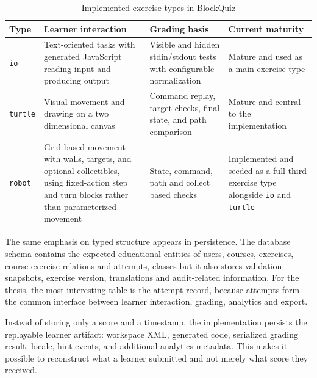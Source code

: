 \begin{table}[H]
  \footnotesize
  \caption{Implemented exercise types in BlockQuiz}
  \label{tab:impl-exercise-families}
  \begin{tabularx}{\textwidth}{|l|X|X|X|}
    \hline
    \textbf{Type}   & \textbf{Learner interaction}                                                                                                                   & \textbf{Grading basis}                                                & \textbf{Current maturity}                                                                        \\\hline
    \texttt{io}     & Text-oriented tasks with generated JavaScript reading input and producing output                                                               & Visible and hidden stdin/stdout tests with configurable normalization & Mature and used as a main exercise type                                                        \\\hline
    \texttt{turtle} & Visual movement and drawing on a two dimensional canvas                                                                                        & Command replay, target checks, final state, and path comparison       & Mature and central to the implementation                                                         \\\hline
    \texttt{robot}  & Grid based movement with walls, targets, and optional collectibles, using fixed-action step and turn blocks rather than parameterized movement & State, command, path and collect based checks                         & Implemented and seeded as a full third exercise type alongside \texttt{io} and \texttt{turtle} \\\hline
  \end{tabularx}
\end{table}

The same emphasis on typed structure appears in persistence. The database schema contains the
expected educational entities of users, courses, exercises, course-exercise relations and attempts,
classes but it also stores validation snapshots, exercise version,
translations and audit-related information.
For the thesis, the most interesting table is the attempt record, because attempts form the
common interface between learner interaction, grading, analytics and export.

Instead of storing only a score and a timestamp, the implementation persists the replayable
learner artifact: workspace XML, generated code, serialized grading result, locale, hint events,
and additional analytics metadata. This makes it possible to reconstruct what a learner
submitted and not merely what score they received.


